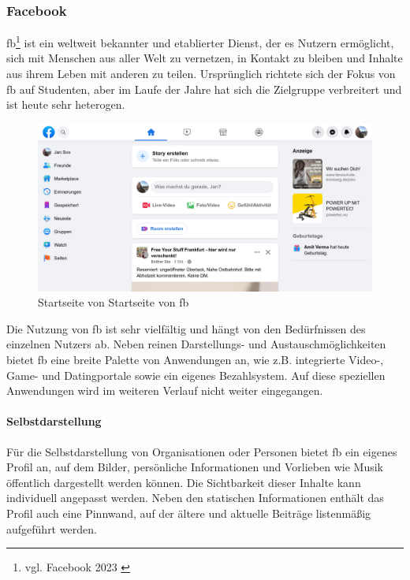 \subsubsection{Facebook}

\acrfull{fb}\footnote{vgl. Facebook 2023 \cite{facebook}} ist ein weltweit bekannter und etablierter Dienst, der es Nutzern ermöglicht, sich mit Menschen aus aller Welt zu vernetzen, in Kontakt zu bleiben und Inhalte aus ihrem Leben mit anderen zu teilen.
Ursprünglich richtete sich der Fokus von \acrshort{fb}  auf Studenten, aber im Laufe der Jahre hat sich die Zielgruppe verbreitert und ist heute sehr heterogen.

\begin{figure}[!htb]
    \centering
    \includegraphics[width=\textwidth]{figures/jan/pic_facebook.png}
    \caption[Startseite von \acrshort{fb}]{Startseite von Startseite von \acrshort{fb}}
    \label{fig:facebook}
\end{figure}

Die Nutzung von \acrshort{fb} ist sehr vielfältig und hängt von den Bedürfnissen des einzelnen Nutzers ab. Neben reinen Darstellungs- und Austauschmöglichkeiten bietet \acrshort{fb} eine breite Palette von Anwendungen an, wie z.B. integrierte Video-, Game- und Datingportale sowie ein eigenes Bezahlsystem. Auf diese speziellen Anwendungen wird im weiteren Verlauf nicht weiter eingegangen.

\paragraph{Selbstdarstellung}

Für die Selbstdarstellung von Organisationen oder Personen bietet \acrshort{fb} ein eigenes Profil an, auf dem Bilder, persönliche Informationen und Vorlieben wie Musik öffentlich dargestellt werden können. Die Sichtbarkeit dieser Inhalte kann individuell angepasst werden. Neben den statischen Informationen enthält das Profil auch eine Pinnwand, auf der ältere und aktuelle Beiträge listenmäßig aufgeführt werden.

